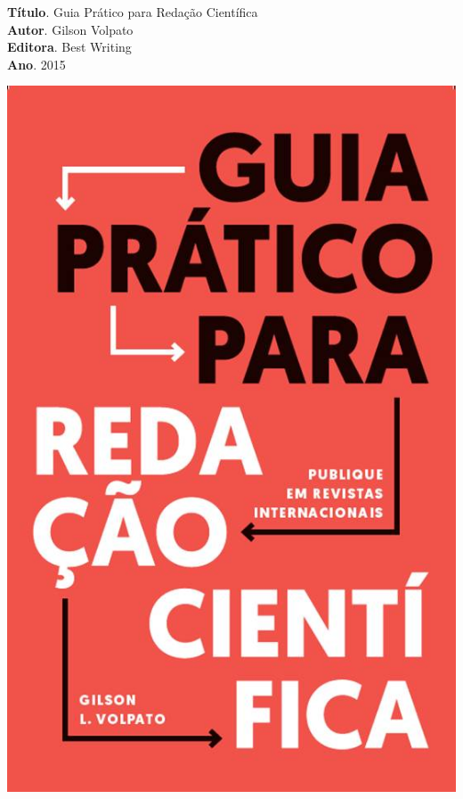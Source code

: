 \noindent \begin{minipage}{0.8\textwidth}
\textbf{Título}. Guia Prático para Redação Científica\\
\textbf{Autor}. Gilson Volpato\\
\textbf{Editora}. Best Writing\\
\textbf{Ano}. 2015\\
\end{minipage}\begin{minipage}{0.2\textwidth}
\includegraphics[width=\linewidth]{./img/volpato}
\end{minipage}

